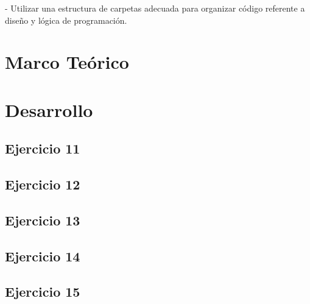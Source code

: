\documentclass[12pt,letterpaper]{article}
\begin{document}
- Utilizar una estructura de carpetas adecuada para organizar código referente a diseño y lógica de programación.


\section{Marco Teórico}



\section{Desarrollo}
\subsection{Ejercicio 11}


\subsection{Ejercicio 12}


\subsection{Ejercicio 13}


\subsection{Ejercicio 14}


\subsection{Ejercicio 15}


\end{document}
